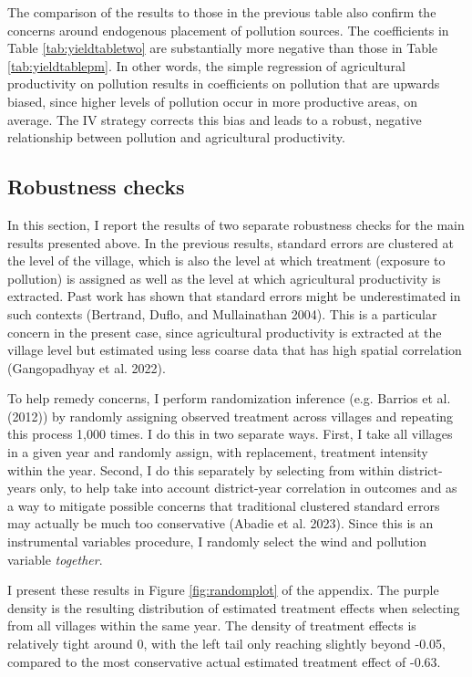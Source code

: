 \documentclass[
]{article}
\begin{document}
The comparison of the results to those in the previous table also confirm the concerns around endogenous placement of pollution sources. The coefficients in Table \ref{tab:yieldtabletwo} are substantially more negative than those in Table \ref{tab:yieldtablepm}. In other words, the simple regression of agricultural productivity on pollution results in coefficients on pollution that are upwards biased, since higher levels of pollution occur in more productive areas, on average. The IV strategy corrects this bias and leads to a robust, negative relationship between pollution and agricultural productivity.

\hypertarget{robustness-checks}{%
\subsection{Robustness checks}\label{robustness-checks}}

In this section, I report the results of two separate robustness checks for the main results presented above. In the previous results, standard errors are clustered at the level of the village, which is also the level at which treatment (exposure to pollution) is assigned as well as the level at which agricultural productivity is extracted. Past work has shown that standard errors might be underestimated in such contexts (Bertrand, Duflo, and Mullainathan 2004). This is a particular concern in the present case, since agricultural productivity is extracted at the village level but estimated using less coarse data that has high spatial correlation (Gangopadhyay et al. 2022).

To help remedy concerns, I perform randomization inference (e.g. Barrios et al. (2012)) by randomly assigning observed treatment across villages and repeating this process 1,000 times. I do this in two separate ways. First, I take all villages in a given year and randomly assign, with replacement, treatment intensity within the year. Second, I do this separately by selecting from within district-years only, to help take into account district-year correlation in outcomes and as a way to mitigate possible concerns that traditional clustered standard errors may actually be much too conservative (Abadie et al. 2023). Since this is an instrumental variables procedure, I randomly select the wind and pollution variable \emph{together}.

I present these results in Figure \ref{fig:randomplot} of the appendix. The purple density is the resulting distribution of estimated treatment effects when selecting from all villages within the same year. The density of treatment effects is relatively tight around 0, with the left tail only reaching slightly beyond -0.05, compared to the most conservative actual estimated treatment effect of -0.63.
\end{document}
